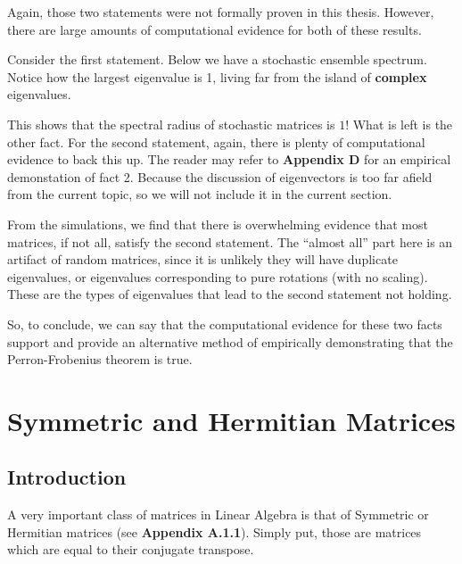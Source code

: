 \newpage

Again, those two statements were not formally proven in this thesis. However, there are large amounts of computational evidence for both of these results.

Consider the first statement. Below we have a stochastic ensemble spectrum.
Notice how the largest eigenvalue is 1, living far from the island of \textbf{complex} eigenvalues.


This shows that the spectral radius of stochastic matrices is $1$! What is left is the other fact.
For the second statement, again, there is plenty of computational evidence to back this up.
The reader may refer to \textbf{Appendix D} for an empirical demonstation of fact 2.
Because the discussion of eigenvectors is too far afield from the current topic, so we will not include it in the current section.

From the simulations, we find that there is overwhelming evidence that most matrices, if not all, satisfy the second statement.
The ``almost all'' part here is an artifact of random matrices, since it is unlikely they will have duplicate eigenvalues, or eigenvalues corresponding to pure rotations (with no scaling).
These are the types of eigenvalues that lead to the second statement not holding. \newline

 So, to conclude, we can say that the computational evidence for these two facts support and provide an alternative method of empirically demonstrating that the Perron-Frobenius theorem is true.


\newpage
\section{Symmetric and Hermitian Matrices}

\subsection{Introduction}
A very important class of matrices in Linear Algebra is that of Symmetric or Hermitian matrices (see \textbf{Appendix A.1.1}). Simply put, those are matrices which are equal to their conjugate transpose.

